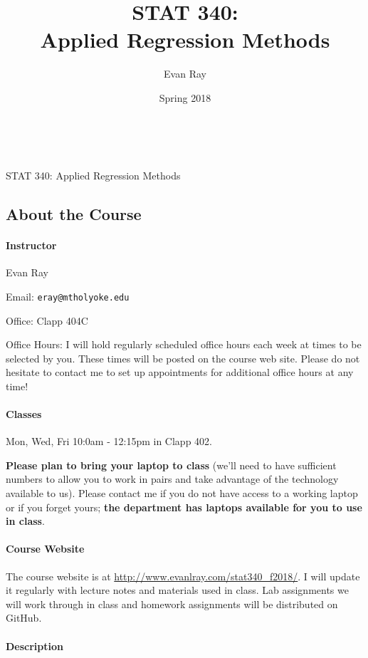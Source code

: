 \documentclass[11pt]{article}
\title{STAT 340:\\Applied Regression Methods}
\author{Evan Ray}
\date{Spring 2018}
\begin{document}

\ \\
\vspace{.01in}
\begin{center}
{\large STAT 340: Applied Regression Methods}
\end{center}
\subsection*{About the Course}

\paragraph{Instructor}

Evan Ray

Email: \texttt{eray@mtholyoke.edu}

Office: Clapp 404C

Office Hours: I will hold regularly scheduled office hours each week at times to be selected by you.  These times will be posted on the course web site.  Please do not hesitate to contact me to set up appointments for additional office hours at any time!

\paragraph{Classes} \mbox{}

Mon, Wed, Fri 10:0am - 12:15pm in Clapp 402.

\textbf{Please plan to bring your laptop to class} (we'll need to have sufficient numbers to allow you to work in pairs and take advantage of the technology available to us).  Please contact me if you do not have access to a working laptop or if you forget yours; \textbf{the department has laptops available for you to use in class}.

\paragraph{Course Website}
The course website is at \url{http://www.evanlray.com/stat340_f2018/}.  I will update it regularly with lecture notes and materials used in class.  Lab assignments we will work through in class and homework assignments will be distributed on GitHub.

\paragraph{Description}
\end{document}
